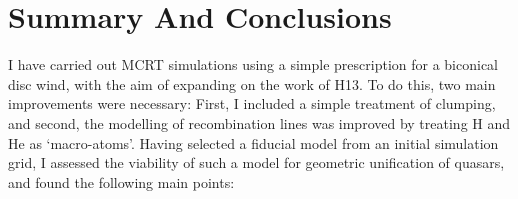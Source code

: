 


\section{Summary And Conclusions}
\label{sec:qso_conclusions}
I have carried out MCRT simulations using a simple
prescription for a biconical disc wind, with
the aim of expanding on the work of H13. To do this, two main
improvements were necessary: First, I included a simple treatment of 
clumping, and second, 
the modelling of recombination lines was improved by treating H and He as
`macro-atoms'. 
Having selected a fiducial model from an initial simulation grid,
I assessed the viability of such a model for geometric 
unification of quasars, and found the following main points:
